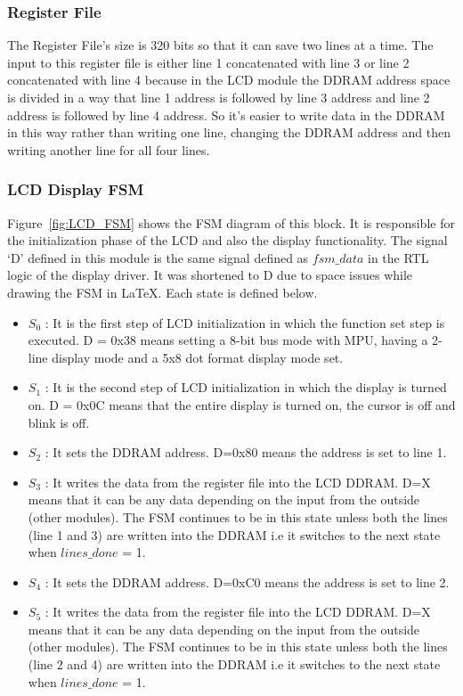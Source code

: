 \documentclass[a4paper]{article}
\begin{document}
\subsubsection{Register File}
The Register File's size is 320 bits so that it can save two lines at a time. The input to this register file is either line 1 concatenated with line 3 or line 2 concatenated with line 4 because in the LCD module the DDRAM address space is divided in a way that line 1 address is followed by line 3 address and line 2 address is followed by line 4 address. So it's easier to write data in the DDRAM in this way rather than writing one line, changing the DDRAM address and then writing another line for all four lines. 

\subsubsection{LCD Display FSM}
Figure~\ref{fig:LCD_FSM} shows the FSM diagram of this block. It is responsible for the initialization phase of the LCD and also the display functionality. The signal `D' defined in this module is the same signal defined as $fsm\_data$ in the RTL logic of the display driver. It was shortened to D due to space issues while drawing the FSM in \LaTeX. Each state is defined below.\\

\begin{itemize}
	\item $S_0$ : It is the first step of LCD initialization in which the function set step is executed. D = 0x38 means setting a 8-bit bus mode with MPU, having a 2-line display mode and a 5x8 dot format display mode set.
	\item $S_1$ : It is the second step of LCD initialization in which the display is turned on. D = 0x0C means that the entire display is turned on, the cursor is off and blink is off.
	\item $S_2$ : It sets the DDRAM address. D=0x80 means the address is set to line 1.
	\item $S_3$ : It writes the data from the register file into the LCD DDRAM. D=X means that it can be any data depending on the input from the outside (other modules). The FSM continues to be in this state unless both the lines (line 1 and 3) are written into the DDRAM i.e it switches to the next state when $lines\_done$ = 1.
	\item $S_4$ : It sets the DDRAM address. D=0xC0 means the address is set to line 2.
	\item $S_5$ : It writes the data from the register file into the LCD DDRAM. D=X means that it can be any data depending on the input from the outside (other modules). The FSM continues to be in this state unless both the lines (line 2 and 4) are written into the DDRAM i.e it switches to the next state when $lines\_done$ = 1.
\end{itemize}
\end{document}
